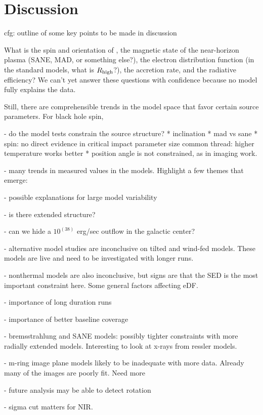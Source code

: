 \section{Discussion}
\label{sec:discussions}

cfg: outline of some key points to be made in discussion

What is the spin and orientation of  \sgra, the magnetic state of the near-horizon plasma (SANE, MAD, or something else?), the electron distribution function (in the standard models, what is $R_\mathrm{high}$?), the accretion rate, and the radiative efficiency?  We can't yet answer these questions with confidence because no model fully explains the data.

Still, there are comprehensible trends in the model space that favor certain source parameters.  For black hole spin,

- do the model tests constrain the source structure?
    * inclination
    * mad vs sane
    * spin: no direct evidence in critical impact parameter size
    common thread: higher temperature works better
    * position angle is not constrained, as in imaging work.

- many trends in measured values in the models.  Highlight a few themes that emerge:

- possible explanations for large model variability

- is there extended structure?

- can we hide a $10^(38)$ erg/sec outflow in the galactic center?

- alternative model studies are inconclusive on tilted and wind-fed models.  These models are live and need to be investigated with longer runs.

- nonthermal models are also inconclusive, but signs are that the SED is the most important constraint here.  Some general factors affecting eDF.

- importance of long duration runs

- importance of better baseline coverage

- bremsstrahlung and SANE models: possibly tighter constraints with more radially extended models.  Interesting to look at x-rays from ressler models.

- m-ring image plane models likely to be inadequate with more data.  Already many of the images are poorly fit.  Need more

- future analysis may be able to detect rotation

- sigma cut matters for NIR.

